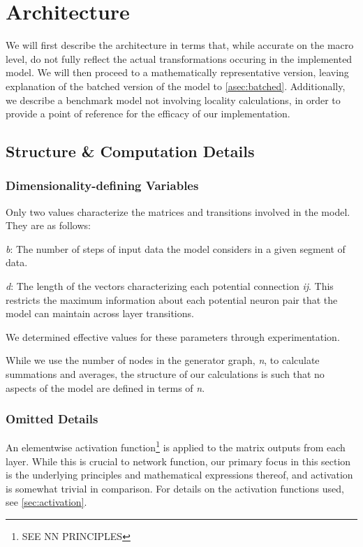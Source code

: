 \section{Architecture}
We will first describe the architecture in terms that, while accurate on the 
macro level, do not fully reflect the actual transformations occuring in the 
implemented model. We will then proceed to a mathematically representative 
version, leaving explanation of the batched version of the model to 
\ref{asec:batched}. Additionally, we describe a benchmark model not involving 
locality calculations, in order to provide a point of reference for the efficacy 
of our implementation.

\subsection{Structure \& Computation Details}
\subsubsection{Dimensionality-defining Variables}
Only two values characterize the matrices and transitions involved in the model.  
They are as follows:
\begin{description}
	\item \textit{b}: The number of steps of input data the model considers in a 
		given segment of data.
	\item \textit{d}: The length of the vectors characterizing each potential 
		connection \textit{ij}. This restricts the maximum information about 
		each potential neuron pair that the model can maintain across layer 
		transitions.
\end{description}
We determined effective values for these parameters through experimentation.

While we use the number of nodes in the generator graph, \textit{n}, to 
calculate summations and averages, the structure of our calculations is such 
that no aspects of the model are defined in terms of \textit{n}.

\subsubsection{Omitted Details}
An elementwise activation function\footnote{SEE NN PRINCIPLES} is applied to the 
matrix outputs from each layer. While this is crucial to network function, our 
primary focus in this section is the underlying principles and mathematical 
expressions thereof, and activation is somewhat trivial in comparison. For 
details on the activation functions used, see \ref{sec:activation}.

